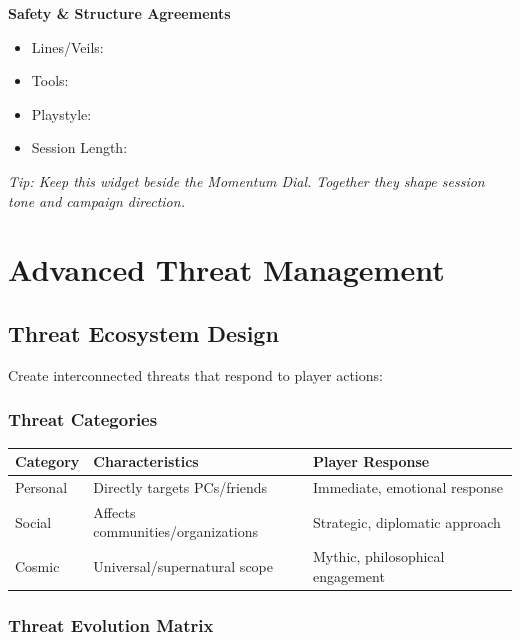 \documentclass[11pt]{article}
\begin{document}
\begin{tcolorbox}
\medskip

\textbf{Safety \& Structure Agreements}
\begin{itemize}[leftmargin=1.2em]
  \item Lines/Veils: \underline{\phantom{XXXXXXXXXXXX}}
  \item Tools: \underline{\phantom{XXXXXXXXXXXX}}
  \item Playstyle: \underline{\phantom{XXXXXXXXXXXX}}
  \item Session Length: \underline{\phantom{XXXX}}
\end{itemize}

\medskip

\textit{Tip: Keep this widget beside the Momentum Dial. Together they shape session tone and campaign direction.}

\end{tcolorbox}

\section{Advanced Threat Management}

\subsection{Threat Ecosystem Design}

Create interconnected threats that respond to player actions:

\subsubsection{Threat Categories}

\begin{longtable}{|p{3cm}|p{4cm}|p{5cm}|}
\hline
\textbf{Category} & \textbf{Characteristics} & \textbf{Player Response} \\
\hline
Personal & Directly targets PCs/friends & Immediate, emotional response \\
Social & Affects communities/organizations & Strategic, diplomatic approach \\
Cosmic & Universal/supernatural scope & Mythic, philosophical engagement \\
\hline
\end{longtable}

\subsubsection{Threat Evolution Matrix}
\end{document}
